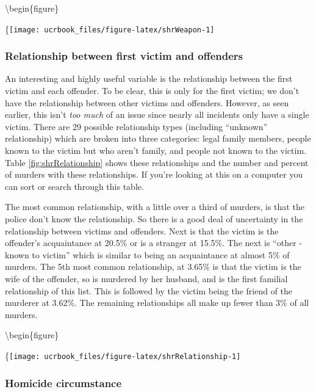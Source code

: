 \documentclass[
  12pt,
  openany]{book}
\begin{document}
\textbackslash begin\{figure\}

\{\centering \texttt{[image: ucrbook\_files/figure-latex/shrWeapon-1]}

\hypertarget{relationship-between-first-victim-and-offenders}{%
\subsubsection{Relationship between first victim and offenders}\label{relationship-between-first-victim-and-offenders}}

An interesting and highly useful variable is the relationship between the first victim and each offender. To be clear, this is only for the first victim; we don't have the relationship between other victims and offenders. However, as seen earlier, this isn't \emph{too much} of an issue since nearly all incidents only have a single victim. There are 29 possible relationship types (including ``unknown'' relationship) which are broken into three categories: legal family members, people known to the victim but who aren't family, and people not known to the victim. Table \ref{fig:shrRelationship} shows these relationships and the number and percent of murders with these relationships. If you're looking at this on a computer you can sort or search through this table.

The most common relationship, with a little over a third of murders, is that the police don't know the relationship. So there is a good deal of uncertainty in the relationship between victims and offenders. Next is that the victim is the offender's acquaintance at 20.5\% or is a stranger at 15.5\%. The next is ``other - known to victim'' which is similar to being an acquaintance at almost 5\% of murders. The 5th most common relationship, at 3.65\% is that the victim is the wife of the offender, so is murdered by her husband, and is the first familial relationship of this list. This is followed by the victim being the friend of the murderer at 3.62\%. The remaining relationships all make up fewer than 3\% of all murders.

\textbackslash begin\{figure\}

\{\centering \texttt{[image: ucrbook\_files/figure-latex/shrRelationship-1]}

\hypertarget{circumstance}{%
\subsubsection{Homicide circumstance}\label{circumstance}}
\end{document}

